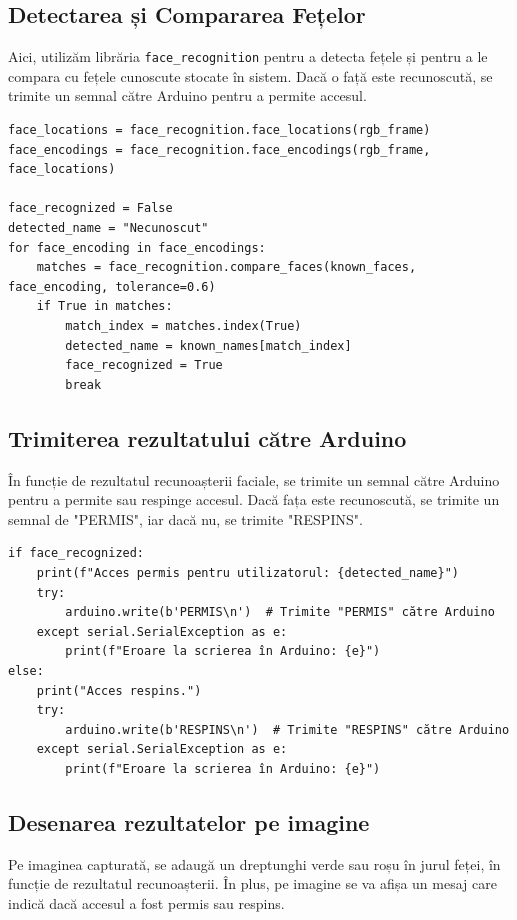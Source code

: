 \documentclass[a4paper,12pt]{report}
\begin{document}
\subsection{Detectarea și Compararea Fețelor}
Aici, utilizăm librăria \texttt{face\_recognition} pentru a detecta fețele și pentru a le compara cu fețele cunoscute stocate în sistem. Dacă o față este recunoscută, se trimite un semnal către Arduino pentru a permite accesul.

\begin{lstlisting}[caption={Detectarea și compararea fețelor}]
face_locations = face_recognition.face_locations(rgb_frame)
face_encodings = face_recognition.face_encodings(rgb_frame, face_locations)

face_recognized = False
detected_name = "Necunoscut"
for face_encoding in face_encodings:
    matches = face_recognition.compare_faces(known_faces, face_encoding, tolerance=0.6)
    if True in matches:
        match_index = matches.index(True)
        detected_name = known_names[match_index]
        face_recognized = True
        break
\end{lstlisting}

\subsection{Trimiterea rezultatului către Arduino}
În funcție de rezultatul recunoașterii faciale, se trimite un semnal către Arduino pentru a permite sau respinge accesul. Dacă fața este recunoscută, se trimite un semnal de "PERMIS", iar dacă nu, se trimite "RESPINS".

\begin{lstlisting}[caption={Trimiterea rezultatului către Arduino}]
if face_recognized:
    print(f"Acces permis pentru utilizatorul: {detected_name}")
    try:
        arduino.write(b'PERMIS\n')  # Trimite "PERMIS" către Arduino
    except serial.SerialException as e:
        print(f"Eroare la scrierea în Arduino: {e}")
else:
    print("Acces respins.")
    try:
        arduino.write(b'RESPINS\n')  # Trimite "RESPINS" către Arduino
    except serial.SerialException as e:
        print(f"Eroare la scrierea în Arduino: {e}")
\end{lstlisting}

\subsection{Desenarea rezultatelor pe imagine}
Pe imaginea capturată, se adaugă un dreptunghi verde sau roșu în jurul feței, în funcție de rezultatul recunoașterii. În plus, pe imagine se va afișa un mesaj care indică dacă accesul a fost permis sau respins.
\end{document}
